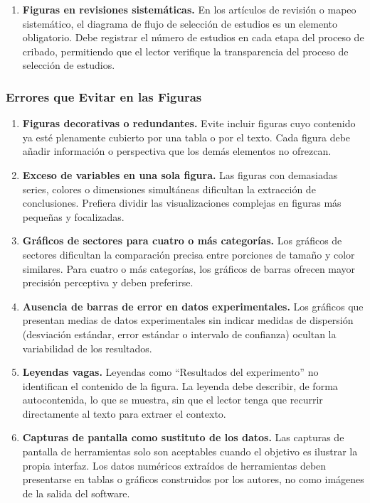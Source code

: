 \documentclass[spanish]{rbie2026}%
\begin{document}
\begin{enumerate}
  \item \textbf{Figuras en revisiones sistemáticas.} En los artículos de revisión o mapeo sistemático, el diagrama de flujo de selección de estudios es un elemento obligatorio. Debe registrar el número de estudios en cada etapa del proceso de cribado, permitiendo que el lector verifique la transparencia del proceso de selección de estudios.
\end{enumerate}


\subsubsection{Errores que Evitar en las Figuras}

\begin{enumerate}
  \item \textbf{Figuras decorativas o redundantes.} Evite incluir figuras cuyo contenido ya esté plenamente cubierto por una tabla o por el texto. Cada figura debe añadir información o perspectiva que los demás elementos no ofrezcan.

  \item \textbf{Exceso de variables en una sola figura.} Las figuras con demasiadas series, colores o dimensiones simultáneas dificultan la extracción de conclusiones. Prefiera dividir las visualizaciones complejas en figuras más pequeñas y focalizadas.

  \item \textbf{Gráficos de sectores para cuatro o más categorías.} Los gráficos de sectores dificultan la comparación precisa entre porciones de tamaño y color similares. Para cuatro o más categorías, los gráficos de barras ofrecen mayor precisión perceptiva y deben preferirse.

  \item \textbf{Ausencia de barras de error en datos experimentales.} Los gráficos que presentan medias de datos experimentales sin indicar medidas de dispersión (desviación estándar, error estándar o intervalo de confianza) ocultan la variabilidad de los resultados.

  \item \textbf{Leyendas vagas.} Leyendas como ``Resultados del experimento'' no identifican el contenido de la figura. La leyenda debe describir, de forma autocontenida, lo que se muestra, sin que el lector tenga que recurrir directamente al texto para extraer el contexto.

  \item \textbf{Capturas de pantalla como sustituto de los datos.} Las capturas de pantalla de herramientas solo son aceptables cuando el objetivo es ilustrar la propia interfaz. Los datos numéricos extraídos de herramientas deben presentarse en tablas o gráficos construidos por los autores, no como imágenes de la salida del software.


\end{enumerate}
\end{document}
